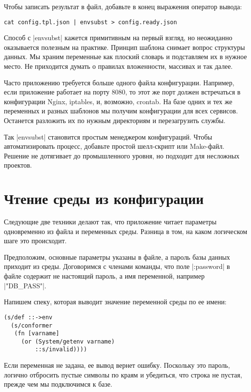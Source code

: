 Чтобы записать результат в файл, добавьте в конец выражения оператор вывода:

\begin{verbatim}
cat config.tpl.json | envsubst > config.ready.json
\end{verbatim}

Способ с \spverb|envsubst| кажется примитивным на первый взгляд, но неожиданно
оказывается полезным на практике. Принцип шаблона снимает вопрос структуры
данных. Мы храним переменные как плоский словарь и подставляем их в нужное
место. Не приходится думать о правилах вложенности, массивах и так далее.

Часто приложению требуется больше одного файла конфигурации. Например, если
приложение работает на порту 8080, то этот же порт должен встречаться в
конфигурации Nginx, iptables, и, возможно, crontab. На базе одних и тех же
переменных и разных шаблонов мы получим конфигурации для всех
сервисов. Останется разложить их по нужным директориям и перезагрузить службы.

Так \spverb|envsubst| становится простым менеджером конфигураций. Чтобы
автоматизировать процесс, добавьте простой шелл-скрипт или Make-файл. Решение не
дотягивает до промышленного уровня, но подходит для несложных проектов.

\section{Чтение среды из конфигурации}

Следующие две техники делают так, что приложение читает параметры одновременно
из файла и переменных среды. Разница в том, на каком логическом шаге это
происходит.

Предположим, основные параметры указаны в файле, а пароль базы данных приходит
из среды. Договоримся с членами команды, что поле \spverb|:password| в файле содержит не
настоящий пароль, а имя переменной, например \spverb|"DB_PASS"|.

Напишем спеку, которая выводит значение переменной среды по ее имени:

\begin{verbatim}
(s/def ::->env
  (s/conformer
   (fn [varname]
     (or (System/getenv varname)
         ::s/invalid))))
\end{verbatim}

Если переменная не задана, ее вывод вернет ошибку. Поскольку это пароль, логично
отбросить пустые символы по краям и убедиться, что строка не пустая, прежде чем
мы подключимся к базе.

